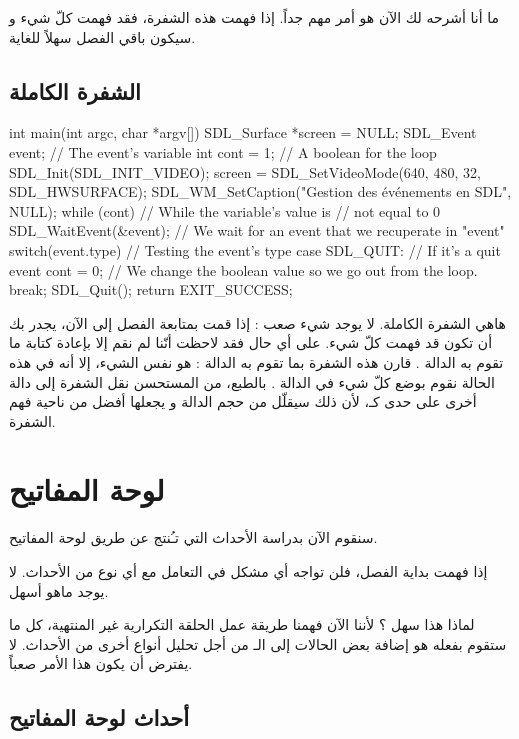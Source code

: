 ما أنا أشرحه لك الآن هو أمر مهم جداً. إذا فهمت هذه الشفرة، فقد فهمت كلّ شيء و سيكون باقي الفصل سهلاً للغاية.

\subsection{الشفرة الكاملة}

\begin{Csource}
int main(int argc, char *argv[])
{
	SDL_Surface *screen = NULL;
	SDL_Event event; // The event's variable
	int cont = 1; // A boolean for the loop
	SDL_Init(SDL_INIT_VIDEO);
	screen = SDL_SetVideoMode(640, 480, 32, SDL_HWSURFACE);
	SDL_WM_SetCaption("Gestion des événements en SDL", NULL);
	while (cont) // While the variable's value is 
	{            // not equal to 0
		SDL_WaitEvent(&event); // We wait for an event that we recuperate in "event"
		switch(event.type) // Testing the event's type
		{
			case SDL_QUIT: // If it's a quit event
			cont = 0; // We change the boolean value so we go out from the loop.
			break;
		}
	}
	SDL_Quit();
	return EXIT_SUCCESS;
}
\end{Csource}

هاهي الشفرة الكاملة. لا يوجد شيء صعب : إذا قمت بمتابعة الفصل إلى الآن، يجدر بك أن تكون قد فهمت كلّ شيء. على أي حال فقد لاحظت أنّنا لم نقم إلا بإعادة كتابة ما تقوم به الدالة 
.
قارن هذه الشفرة بما تقوم به الدالة
 :
هو نفس الشيء، إلا أنه في هذه الحالة نقوم بوضع كلّ شيء في الدالة
.
بالطبع، من المستحسن نقل الشفرة إلى دالة أخرى على حدى كـ،
لأن ذلك سيقلّل من حجم الدالة
و يجعلها أفضل من ناحية فهم الشفرة.

\section{لوحة المفاتيح}

سنقوم الآن بدراسة الأحداث التي تـُنتج عن طريق لوحة المفاتيح.

إذا فهمت بداية الفصل، فلن تواجه أي مشكل في التعامل مع أي نوع من الأحداث. لا يوجد ماهو أسهل.

لماذا هذا سهل ؟ لأننا الآن فهمنا طريقة عمل الحلقة التكرارية غير المنتهية، كل ما ستقوم بفعله هو إضافة بعض الحالات إلى الـ
من أجل تحليل أنواع أخرى من الأحداث. لا يفترض أن يكون هذا الأمر صعباً.

\subsection{أحداث لوحة المفاتيح}

